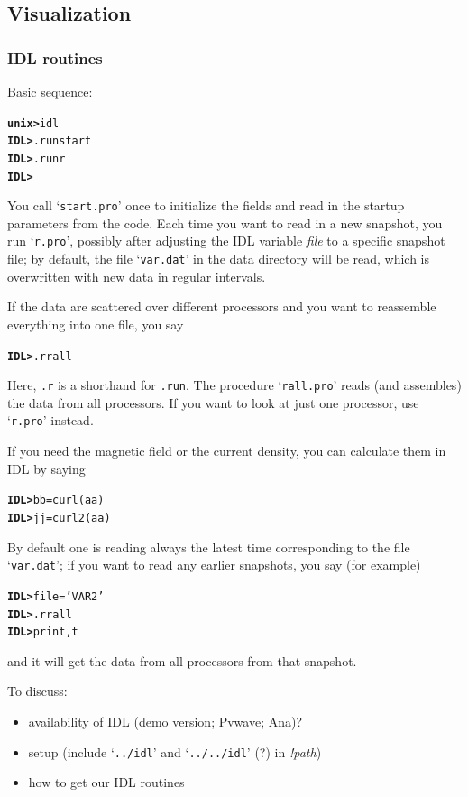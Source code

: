 \documentclass[12pt,twoside,notitlepage,a4paper]{article}
\makeatletter
\newcommand{\prompt}[1]{{\ttfamily\bfseries{}#1}}
\newcommand{\code}[1]{\texttt{#1}}
\newcommand{\var}[1]{\textsl{#1}\index{#1@\emph{#1}}\/}
\newcommand{\file}[1]{`\texttt{#1}'}
\newcommand{\command}[1]{\code{#1}\index{#1}}
\newcommand{\cmd}[1]{\command{#1}}
\makeatother
\begin{document}
\subsection{Visualization}


\subsubsection{IDL routines}
\label{S-IDLroutines}

Basic sequence:
\begin{alltt}
  \prompt{unix> } idl
  \prompt{IDL> }  .run start
  \prompt{IDL> }  .run r
  \prompt{IDL> }  {} \
\end{alltt}
You call \file{start.pro} once to initialize the fields and read in the
startup parameters from the code.
Each time you want to read in a new snapshot, you run \file{r.pro},
possibly after adjusting the IDL variable \var{file} to a specific snapshot
file; by default, the file \file{var.dat} in the data directory will be
read, which is overwritten with new data in regular intervals.

If the data are scattered over different processors and you want to
reassemble everything into one file, you say
\begin{alltt}
  \prompt{IDL> }  .r rall
\end{alltt}
Here, \cmd{.r} is a shorthand for \cmd{.run}.
The procedure \file{rall.pro} reads (and assembles) the data from all
processors.
If you want to look at just one processor, use \file{r.pro} instead.

If you need the magnetic field or the current density, you can calculate
them in IDL by saying
\begin{alltt}
  \prompt{IDL> }  bb=curl(aa)
  \prompt{IDL> }  jj=curl2(aa)
\end{alltt}

By default one is reading always the latest time corresponding to the file
\file{var.dat}; if you want to read any earlier snapshots, you say (for
example)
\begin{alltt}
  \prompt{IDL> }  file='VAR2'
  \prompt{IDL> }  .r rall
  \prompt{IDL> }  print,t
\end{alltt}
and it will get the data from all processors from that snapshot.

To discuss:
\begin{itemize}
\item availability of IDL (demo version; Pvwave; Ana)?
\item setup (include \file{../idl} and \file{../../idl} (?) in \var{!path})
\item how to get our IDL routines
\end{itemize}
\end{document}
